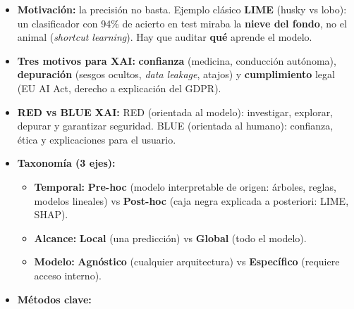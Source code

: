 \documentclass[12pt]{book} %
\providecommand{\tightlist}{%
  \setlength{\itemsep}{0pt}\setlength{\parskip}{0pt}}
\begin{document}
\begin{itemize}
\tightlist
\item
  \textbf{Motivación:} la precisión no basta. Ejemplo clásico
  \textbf{LIME} (husky vs lobo): un clasificador con 94\% de acierto en
  test miraba la \textbf{nieve del fondo}, no el animal (\emph{shortcut
  learning}). Hay que auditar \textbf{qué} aprende el modelo.
\item
  \textbf{Tres motivos para XAI:} \textbf{confianza} (medicina,
  conducción autónoma), \textbf{depuración} (sesgos ocultos, \emph{data
  leakage}, atajos) y \textbf{cumplimiento} legal (EU AI Act, derecho a
  explicación del GDPR).
\item
  \textbf{RED vs BLUE XAI:} RED (orientada al modelo): investigar,
  explorar, depurar y garantizar seguridad. BLUE (orientada al humano):
  confianza, ética y explicaciones para el usuario.
\item
  \textbf{Taxonomía (3 ejes):}

  \begin{itemize}
  \tightlist
  \item
    \textbf{Temporal:} \textbf{Pre-hoc} (modelo interpretable de origen:
    árboles, reglas, modelos lineales) vs \textbf{Post-hoc} (caja negra
    explicada a posteriori: LIME, SHAP).
  \item
    \textbf{Alcance:} \textbf{Local} (una predicción) vs \textbf{Global}
    (todo el modelo).
  \item
    \textbf{Modelo:} \textbf{Agnóstico} (cualquier arquitectura) vs
    \textbf{Específico} (requiere acceso interno).
  \end{itemize}
\item
  \textbf{Métodos clave:}


\end{itemize}
\end{document}
